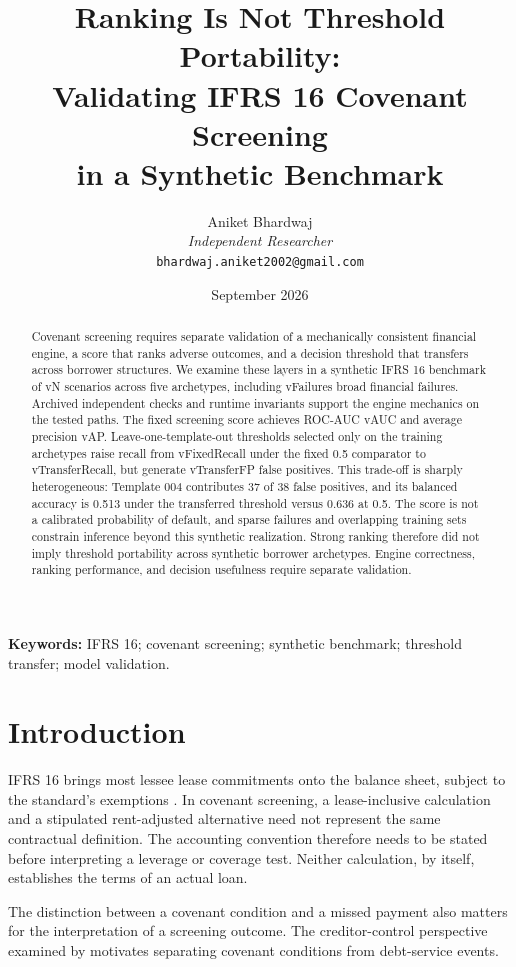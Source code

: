 \documentclass[11pt,a4paper]{article}
\title{Ranking Is Not Threshold Portability:\\Validating IFRS 16 Covenant Screening\\in a Synthetic Benchmark}
\author{Aniket Bhardwaj\\\textit{Independent Researcher}\\\texttt{bhardwaj.aniket2002@gmail.com}}
\date{September 2026}
\newcommand{\val}[1]{\csname v#1\endcsname}
\begin{document}
\maketitle
\begin{abstract}
Covenant screening requires separate validation of a mechanically consistent financial engine, a score that ranks adverse outcomes, and a decision threshold that transfers across borrower structures. We examine these layers in a synthetic IFRS 16 benchmark of \val{N} scenarios across five archetypes, including \val{Failures} broad financial failures. Archived independent checks and runtime invariants support the engine mechanics on the tested paths. The fixed screening score achieves ROC-AUC \val{AUC} and average precision \val{AP}. Leave-one-template-out thresholds selected only on the training archetypes raise recall from \val{FixedRecall} under the fixed 0.5 comparator to \val{TransferRecall}, but generate \val{TransferFP} false positives. This trade-off is sharply heterogeneous: Template 004 contributes 37 of 38 false positives, and its balanced accuracy is 0.513 under the transferred threshold versus 0.636 at 0.5. The score is not a calibrated probability of default, and sparse failures and overlapping training sets constrain inference beyond this synthetic realization. Strong ranking therefore did not imply threshold portability across synthetic borrower archetypes. Engine correctness, ranking performance, and decision usefulness require separate validation.
\end{abstract}
\noindent\textbf{Keywords:} IFRS 16; covenant screening; synthetic benchmark; threshold transfer; model validation.

\section{Introduction}
IFRS 16 brings most lessee lease commitments onto the balance sheet, subject to the standard's exemptions \citep{ifrs2016leases}. In covenant screening, a lease-inclusive calculation and a stipulated rent-adjusted alternative need not represent the same contractual definition. The accounting convention therefore needs to be stated before interpreting a leverage or coverage test. Neither calculation, by itself, establishes the terms of an actual loan.

The distinction between a covenant condition and a missed payment also matters for the interpretation of a screening outcome. The creditor-control perspective examined by \citet{nini2009creditor} motivates separating covenant conditions from debt-service events.
\end{document}
